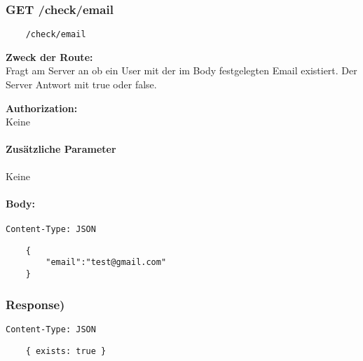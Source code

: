 \label{/other}

\newpage
\subsubsection{GET /check/email}

\begin{lstlisting}
    /check/email
\end{lstlisting}

\textbf{Zweck der Route:} \\
Fragt am Server an ob ein User mit der im Body
festgelegten Email existiert. Der Server Antwort mit
true oder false.

\textbf{Authorization:} \\
Keine

\paragraph{Zusätzliche Parameter}
Keine

\paragraph{Body:}
\lstinline{Content-Type: JSON}
\begin{lstlisting}
    {
        "email":"test@gmail.com"
    }
\end{lstlisting}

\subsubsection{Response)}

\lstinline{Content-Type: JSON}
\begin{lstlisting}
    { exists: true }
\end{lstlisting}

\pagebreak
